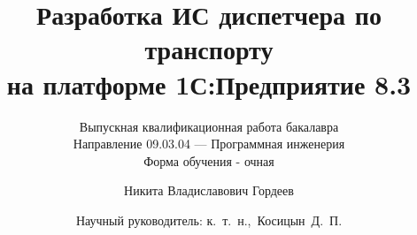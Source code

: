 
%

\title[%
    Разработка ИС диспетчера по транспорту
]{%
    Разработка ИС диспетчера по транспорту \\
    на платформе 1С:Предприятие 8.3
}

\subtitle{Выпускная квалификационная работа бакалавра\\
Направление 09.03.04 --- Программная инженерия\\
Форма обучения - очная
}

\author[%
    Никита Гордеев
]{%
    Никита Владиславович Гордеев 
}

\date[%
    22.04.2025
]{%
    Научный руководитель: к.~т.~н.,~Косицын~Д.~П.
}


\begin{frame}
  \titlepage
\end{frame}
